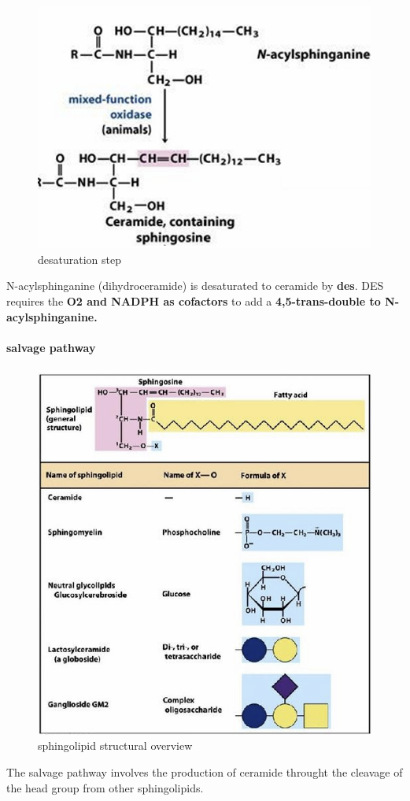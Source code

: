 \documentclass[../main.tex]{subfiles}
\begin{document}
\begin{figure}[H]
    \centering
    \includegraphics[width=0.5\linewidth]{step4S.png}
    \caption{desaturation step}
    \label{fig:enter-label}
\end{figure}
N-acylsphinganine (dihydroceramide) 
is desaturated to ceramide by \textbf{\gls{des}}. DES requires the \textbf{O2 and NADPH as cofactors} to add a\textbf{ 4,5-trans-double to  N-acylsphinganine.}


\paragraph{salvage pathway}
\begin{figure}[H]
    \centering
    \includegraphics[width=0.5\linewidth]{sphingolipids_overview.png}
    \caption{sphingolipid structural overview}
    \label{fig:enter-label}
\end{figure}
The salvage pathway involves the production of ceramide throught the cleavage of the head group from other sphingolipids.
\end{document}

